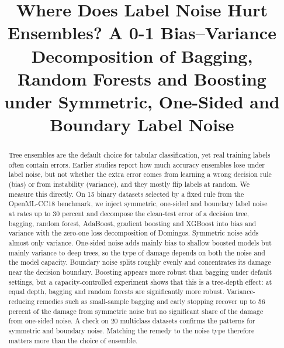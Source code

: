 \documentclass[conference,a4paper]{IEEEtran}
\begin{document}
\title{Where Does Label Noise Hurt Ensembles? A 0-1 Bias--Variance Decomposition of Bagging, Random Forests and Boosting under Symmetric, One-Sided and Boundary Label Noise}

\author{
\and
{}
\and
{}
}

\maketitle

\begin{abstract}
Tree ensembles are the default choice for tabular classification, yet real training labels often contain errors. Earlier studies report how much accuracy ensembles lose under label noise, but not whether the extra error comes from learning a wrong decision rule (bias) or from instability (variance), and they mostly flip labels at random. We measure this directly. On 15 binary datasets selected by a fixed rule from the OpenML-CC18 benchmark, we inject symmetric, one-sided and boundary label noise at rates up to 30 percent and decompose the clean-test error of a decision tree, bagging, random forest, AdaBoost, gradient boosting and XGBoost into bias and variance with the zero-one loss decomposition of Domingos. Symmetric noise adds almost only variance. One-sided noise adds mainly bias to shallow boosted models but mainly variance to deep trees, so the type of damage depends on both the noise and the model capacity. Boundary noise splits roughly evenly and concentrates its damage near the decision boundary. Boosting appears more robust than bagging under default settings, but a capacity-controlled experiment shows that this is a tree-depth effect: at equal depth, bagging and random forests are significantly more robust. Variance-reducing remedies such as small-sample bagging and early stopping recover up to 56 percent of the damage from symmetric noise but no significant share of the damage from one-sided noise. A check on 20 multiclass datasets confirms the patterns for symmetric and boundary noise. Matching the remedy to the noise type therefore matters more than the choice of ensemble.
\end{abstract}
\end{document}
